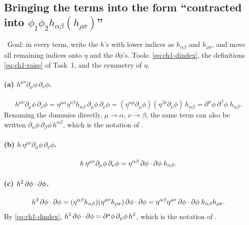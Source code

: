 \subsection{Bringing the terms into the form ``contracted into \texorpdfstring{$\phi_1\phi_2h_{\alpha\beta}(h_{\rho\sigma})$}{phi1 phi2 h h}''}
\label{sec:ch1-t2-contract}

\tD\ Goal: in every term, write the $h$'s with lower indices as $h_{\alpha\beta}$
and $h_{\rho\sigma}$, and move all remaining indices onto $\eta$ and the
$\partial\phi$'s. Tools: \eqref{eq:ch1-dindex}, the definitions
\eqref{eq:ch1-raise} of Task~1, and the symmetry of $\eta$.

\paragraph{(a) $h^{\mu\nu}\partial_\mu\phi\,\partial_\nu\phi$.}
\begin{equation}
h^{\mu\nu}\partial_\mu\phi\,\partial_\nu\phi=\eta^{\mu\alpha}\eta^{\nu\beta}h_{\alpha\beta}\,\partial_\mu\phi\,\partial_\nu\phi=(\eta^{\alpha\mu}\partial_\mu\phi)(\eta^{\beta\nu}\partial_\nu\phi)\,h_{\alpha\beta}=\partial^\alpha\phi\,\partial^\beta\phi\;h_{\alpha\beta}.
\label{eq:ch1-ca}
\end{equation}
Renaming the dummies directly, $\mu\to\alpha$, $\nu\to\beta$, the same term can
also be written $\partial_\alpha\phi\,\partial_\beta\phi\,h^{\alpha\beta}$, which is
the notation of .

\paragraph{(b) $h\,\eta^{\mu\nu}\partial_\mu\phi\,\partial_\nu\phi$.}
\begin{equation}
h\,\eta^{\mu\nu}\partial_\mu\phi\,\partial_\nu\phi=\eta^{\alpha\beta}\,\partial\phi\cdot\partial\phi\;h_{\alpha\beta}.
\label{eq:ch1-cb}
\end{equation}

\paragraph{(c) $h^2\,\partial\phi\cdot\partial\phi$.}
\begin{equation}
h^2\,\partial\phi\cdot\partial\phi=(\eta^{\alpha\beta}h_{\alpha\beta})(\eta^{\rho\sigma}h_{\rho\sigma})\,\partial\phi\cdot\partial\phi=\eta^{\alpha\beta}\eta^{\rho\sigma}\,\partial\phi\cdot\partial\phi\;h_{\alpha\beta}h_{\rho\sigma}.
\label{eq:ch1-cc}
\end{equation}
By \eqref{eq:ch1-dindex}, $h^2\,\partial\phi\cdot\partial\phi=\partial^\mu\phi\,\partial_\mu\phi\,h^2$,
which is the notation of .

